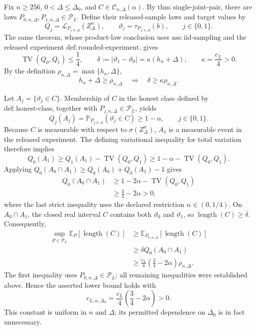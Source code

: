 Fix \(n\geq256\), \(0<\Delta\leq\Delta_0\), and \(C\in\mathcal C_{n,\Delta}(\alpha)\).  By \(\mathrm{thm:single\text{-}joint\text{-}pair}\), there are laws \(P_{0,n,\Delta},P_{1,n,\Delta}\in\mathcal P_L\).  Define their released-sample laws and target values by
\[
 Q_j=\mathcal L_{P_{j,n,\Delta}}(Z_\Delta^n),
 \qquad
 \vartheta_j=\tau_{P_{j,n,\Delta}}(b),
 \qquad j\in\{0,1\}.
\]
The same theorem, whose product-law conclusion uses \(\mathrm{ass:iid\text{-}sampling}\) and the released experiment \(\mathrm{def:rounded\text{-}experiment}\), gives
\[
 \operatorname{TV}(Q_0,Q_1)\leq\frac14,
 \qquad
 \delta:=|\vartheta_1-\vartheta_0|
 =\kappa(h_n+\Delta),
 \qquad
 \kappa=\frac{c_L}{4}>0.
\]
By the definition \(\rho_{n,\Delta}=\max\{h_n,\Delta\}\),
\[
 h_n+\Delta\geq\rho_{n,\Delta}
 \quad\Longrightarrow\quad
 \delta\geq\kappa\rho_{n,\Delta}.
\]

Let \(A_j=\{\vartheta_j\in C\}\).  Membership of \(C\) in the honest class defined by \(\mathrm{def:honest\text{-}class}\), together with \(P_{j,n,\Delta}\in\mathcal P_L\), yields
\[
 Q_j(A_j)=\mathbb P_{P_{j,n,\Delta}}(\vartheta_j\in C)\geq1-\alpha,
 \qquad j\in\{0,1\}.
\]
Because \(C\) is measurable with respect to \(\sigma(Z_\Delta^n)\), \(A_1\) is a measurable event in the released experiment.  The defining variational inequality for total variation therefore implies
\[
 Q_0(A_1)
 \geq Q_1(A_1)-\operatorname{TV}(Q_0,Q_1)
 \geq1-\alpha-\operatorname{TV}(Q_0,Q_1).
\]
Applying \(Q_0(A_0\cap A_1)\geq Q_0(A_0)+Q_0(A_1)-1\) gives
\[
 \begin{aligned}
 Q_0(A_0\cap A_1)
 &\geq1-2\alpha-\operatorname{TV}(Q_0,Q_1)\\
 &\geq\frac34-2\alpha>0,
 \end{aligned}
\]
where the last strict inequality uses the declared restriction \(\alpha\in(0,1/4)\).  On \(A_0\cap A_1\), the closed real interval \(C\) contains both \(\vartheta_0\) and \(\vartheta_1\), so \(\operatorname{length}(C)\geq\delta\).  Consequently,
\[
 \begin{aligned}
 \sup_{P\in\mathcal P_L}\mathbb E_P[\operatorname{length}(C)]
 &\geq \mathbb E_{P_{0,n,\Delta}}[\operatorname{length}(C)]\\
 &\geq \delta Q_0(A_0\cap A_1)\\
 &\geq \frac{c_L}{4}\left(\frac34-2\alpha\right)\rho_{n,\Delta}.
 \end{aligned}
\]
The first inequality uses \(P_{0,n,\Delta}\in\mathcal P_L\); all remaining inequalities were established above.  Hence the asserted lower bound holds with
\[
 c_{L,\alpha,\Delta_0}
 =\frac{c_L}{4}\left(\frac34-2\alpha\right)>0.
\]
This constant is uniform in \(n\) and \(\Delta\); its permitted dependence on \(\Delta_0\) is in fact unnecessary.

